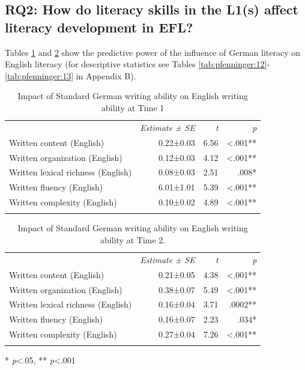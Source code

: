 \documentclass[output=paper,modfonts,nonflat,newtxmath]{langsci/langscibook}
\begin{document}
\subsection{RQ2: {How} {do} {literacy} {skills} {in} {the} {L1(s)} {affect} {literacy} {development} {in} {EFL?}}

Tables \ref{tab:pfenninger:10} and \ref{tab:pfenninger:11} show the predictive power of the influence of German literacy on English literacy (for descriptive statistics see Tables \ref{tab:pfenninger:12}-\ref{tab:pfenninger:13} in Appendix B).

\begin{table}
\caption{\label{tab:pfenninger:10}Impact of Standard German writing ability on English writing ability at Time 1}

\begin{tabularx}{0.86\textwidth}{lrrr}
\lsptoprule
& \textit{Estimate} \textit{±} \textit{SE} & \textit{t} & \textit{p}\\
\cmidrule{1-4}
Written content (English) & 0.22±0.03 & 6.56 & <.001**\\
Written organization (English) & 0.12±0.03 & 4.12 & <.001**\\
Written lexical richness (English) & 0.08±0.03 & 2.51 & .008*\\
Written fluency (English) & 6.01±1.01 & 5.39 & <.001**\\
Written complexity (English) & 0.10±0.02 & 4.89 & <.001**\\
\lspbottomrule
\end{tabularx}
\end{table}

\begin{table}
\caption{\label{tab:pfenninger:11}Impact of Standard German writing ability on English writing ability at Time 2.}

\begin{tabularx}{0.86\textwidth}{lrrr}
\lsptoprule
& \textit{Estimate} \textit{±} \textit{SE} & \textit{t} & \textit{p}\\
\cmidrule{1-4}
Written content (English) & 0.21±0.05 & 4.38 & <.001**\\
Written organization (English) & 0.38±0.07 & 5.49 & <.001**\\
Written lexical richness (English) & 0.16±0.04 & 3.71 & .0002**\\
Written fluency (English) & 0.16±0.07 & 2.23 & .034*\\
Written complexity (English) & 0.27±0.04 & 7.26 & <.001**\\
\lspbottomrule
\end{tabularx}

* \textit{p}<.05, ** \textit{p}<.001
\end{table}
\end{document}
